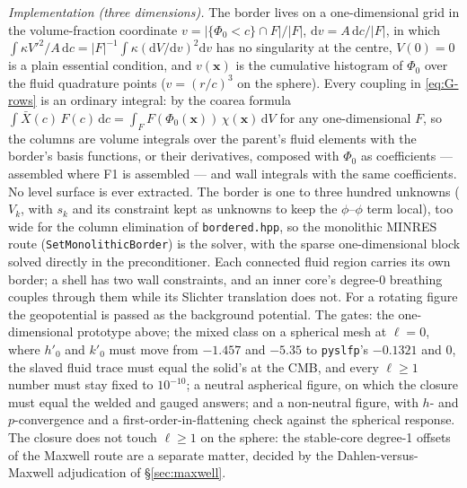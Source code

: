 \documentclass[11pt]{article}
\newcommand{\dV}{\,\mathrm{d}V}
\newcommand{\code}[1]{\texttt{#1}}
\begin{document}
\emph{Implementation (three dimensions).} The border lives on a
one-dimensional grid in the volume-fraction coordinate
$v = |\{\Phi_0 < c\}\cap F|/|F|$, $\mathrm dv = A\,\mathrm dc/|F|$, in
which $\int\kappa V'^2/A\,\mathrm dc = |F|^{-1}\int\kappa(\mathrm dV/\mathrm dv)^2\mathrm dv$
has no singularity at the centre, $V(0) = 0$ is a plain essential
condition, and $v(\mathbf x)$ is the cumulative histogram of
$\Phi_0$ over the fluid quadrature points ($v = (r/c)^3$ on the sphere).
Every coupling in \eqref{eq:G-rows} is an ordinary integral: by the
coarea formula $\int\bar X(c)\,F(c)\,\mathrm dc = \int_F F(\Phi_0(\mathbf x))\,\chi(\mathbf x)\dV$
for any one-dimensional $F$, so the columns are volume integrals over
the parent's fluid elements with the border's basis functions, or their
derivatives, composed with $\Phi_0$ as coefficients --- assembled where
F1 is assembled --- and wall integrals with the same coefficients.
No level surface is ever extracted. The border is one to three hundred
unknowns ($V_k$, with $s_k$ and its constraint kept as unknowns to keep
the $\phi$--$\phi$ term local), too wide for the column elimination of
\code{bordered.hpp}, so the monolithic MINRES route
(\code{SetMonolithicBorder}) is the solver, with the sparse
one-dimensional block solved directly in the preconditioner. Each
connected fluid region carries its own border; a shell has two wall
constraints, and an inner core's degree-0 breathing couples through
them while its Slichter translation does not. For a rotating figure the
geopotential is passed as the background potential. The gates: the one-dimensional prototype above; the mixed class on a
spherical mesh at $\ell = 0$, where $h'_0$ and $k'_0$ must move from
$-1.457$ and $-5.35$ to \code{pyslfp}'s $-0.1321$ and $0$, the slaved
fluid trace must equal the solid's at the CMB, and every $\ell \ge 1$
number must stay fixed to $10^{-10}$; a neutral aspherical figure, on
which the closure must equal the welded and gauged answers; and a
non-neutral figure, with $h$- and $p$-convergence and a
first-order-in-flattening check against the spherical response. The
closure does not touch $\ell \ge 1$ on the sphere: the stable-core
degree-1 offsets of the Maxwell route are a
separate matter, decided by the Dahlen-versus-Maxwell adjudication of
\S\ref{sec:maxwell}.
\end{document}
